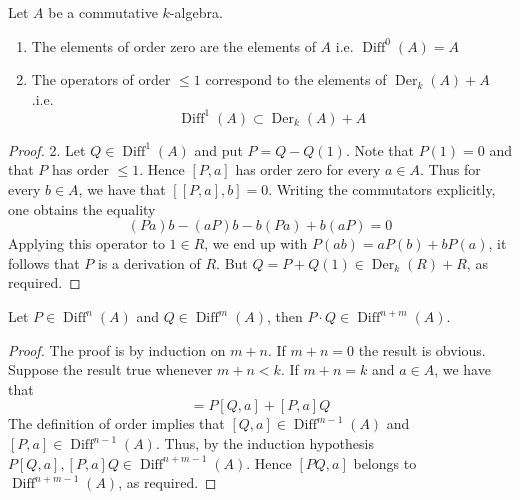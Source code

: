 \documentclass[12pt, oneside]{book}
\begin{document}
\begin{proposition}
    Let $A$ be a commutative $k$-algebra.
    \begin{enumerate}
        \item
              The elements of order zero are the elements of $A$ i.e. $\operatorname{Diff}^0\left(A\right)=A$
        \item
              The operators of order $\leq 1$ correspond to the elements of $\operatorname{Der}_k(A)+A$ .i.e. \begin{equation*}
                  \operatorname{Diff}^1\left(A\right)
                  \subset \operatorname{Der}_k(A)+A
              \end{equation*}
    \end{enumerate}
    \begin{proof}
        2.
        Let $Q \in \operatorname{Diff}^1(A)$ and put $P=Q-Q(1)$. Note that $P(1)=0$ and that $P$ has order $\leq 1$. Hence $[P, a]$ has order zero for every $a \in A$. Thus for every $b \in A$, we have that $[[P, a], b]=0$.
        Writing the commutators explicitly, one obtains the equality
        \begin{equation*}
            (P a) b-(a P) b-b(P a)+b(a P)=0
        \end{equation*}
        Applying this operator to $1 \in R$, we end up with $P(a b)=a P(b)+b P(a)$, it follows that $P$ is a derivation of $R$. But $Q= P+Q(1) \in \operatorname{Der}_k(R)+R$, as required.
    \end{proof}
\end{proposition}



\begin{proposition}
    Let $P \in \operatorname{Diff}^n(A)$ and $Q \in \operatorname{Diff}^m(A)$, then $P \cdot Q \in \operatorname{Diff}^{n+m}(A)$.
    \begin{proof}
        The proof is by induction on $m+n$. If $m+n=0$ the result is obvious. Suppose the result true whenever $m+n<k$. If $m+n=k$ and $a \in A$, we have that
        \begin{equation*}
            [P Q, a]=P[Q, a]+[P, a] Q
        \end{equation*}
        The definition of order implies that $[Q, a] \in \operatorname{Diff}^{m-1}(A)$ and $[P, a] \in \operatorname{Diff}^{n-1}(A)$. Thus, by the induction hypothesis $P[Q, a],[P, a] Q \in \operatorname{Diff}^{n+m-1}(A)$. Hence $[P Q, a]$ belongs to $\operatorname{Diff}^{n+m-1}(A)$, as required.
    \end{proof}
\end{proposition}
\end{document}
